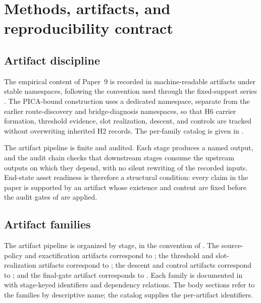 \documentclass[11pt]{article}
\newcommand{\OldLayer}{H2}
\newcommand{\NewLayer}{H6}
\newcommand{\PaperNine}{Paper~9}
\theoremstyle{definition}
\begin{document}
 \section{Methods, artifacts, and reproducibility contract}\label{app:methods}

\subsection{Artifact discipline}\label{subsec:artifact-discipline}

The empirical content of \PaperNine{} is recorded in machine-readable artifacts
under stable namespaces, following the convention used through the
fixed-support series
\cite{Tsiokos2026CarrierToEvent,Tsiokos2026CarrierExactification}.  The
PICA-bound construction uses a dedicated namespace, separate from the earlier
route-discovery and bridge-diagnosis namespaces, so that \NewLayer{} carrier
formation, threshold evidence, slot realization, descent, and controls are
tracked without overwriting inherited \OldLayer{} records.  The per-family
catalog is given in .

The artifact pipeline is finite and audited.  Each stage produces a named
output, and the audit chain checks that downstream stages consume the upstream
outputs on which they depend, with no silent rewriting of the recorded inputs.
End-state asset readiness is therefore a structural condition: every claim in
the paper is supported by an artifact whose existence and content are fixed
before the audit gates of
 are applied.

\subsection{Artifact families}\label{subsec:artifact-families}

The artifact pipeline is organized by stage, in the convention of
\cite{Tsiokos2026CarrierToEvent,Tsiokos2026CarrierExactification}.  The
source-policy and exactification artifacts correspond to ;
the threshold and slot-realization artifacts correspond to
; the descent and control artifacts correspond to
; and the final-gate artifact corresponds to
.  Each family is documented in 
with stage-keyed identifiers and dependency relations.  The body sections refer
to the families by descriptive name; the catalog supplies the per-artifact
identifiers.
\end{document}
